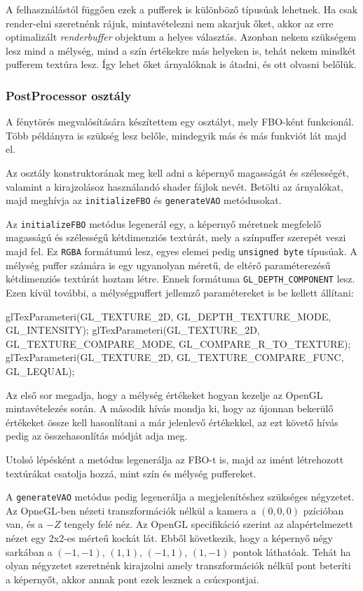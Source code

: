 A felhasználástól függően ezek a pufferek is különböző típusúak lehetnek. Ha csak render-elni szeretnénk rájuk, mintavételezni nem akarjuk őket, akkor az erre optimalizált \textit{renderbuffer} objektum a helyes választás. Azonban nekem szükségem lesz mind a mélység, mind a szín értékekre más helyeken is, tehát nekem mindkét pufferem textúra lesz. Így lehet őket árnyalóknak is átadni, és ott olvasni belőlük. 

\subsubsection{PostProcessor osztály}
A fénytörés megvalósítására készítettem egy osztályt, mely FBO-ként funkcionál. Több példányra is szükség lesz belőle, mindegyik más és más funkviót lát majd el.

Az osztály konstruktorának meg kell adni a képernyő magasságát és szélességét, valamint a kirajzolásoz használandó shader fájlok nevét. Betölti az árnyalókat, majd meghívja az \texttt{initializeFBO} és \texttt{generateVAO} metódusokat.

Az \texttt{initializeFBO} metódus legenerál egy, a képernyő méretnek megfelelő magasságú és szélességű kétdimenziós textúrát, mely a színpuffer szerepét veszi majd fel. Ez \texttt{RGBA} formátumú lesz, egyes elemei pedig \texttt{unsigned byte} típusúak. A mélység puffer számára is egy ugyanolyan méretű, de eltérő paraméterezésű kétdimenziós textúrát hoztam létre. Ennek formátuma \texttt{GL\_DEPTH\_COMPONENT} lesz. Ezen kívül további, a mélységpuffert jellemző paramétereket is be kellett állítani:
\begin{cpp}
glTexParameteri(GL_TEXTURE_2D, GL_DEPTH_TEXTURE_MODE, GL_INTENSITY);
glTexParameteri(GL_TEXTURE_2D, GL_TEXTURE_COMPARE_MODE, 
						GL_COMPARE_R_TO_TEXTURE);
glTexParameteri(GL_TEXTURE_2D, GL_TEXTURE_COMPARE_FUNC, GL_LEQUAL);
\end{cpp}
Az első sor megadja, hogy a mélység értékeket hogyan kezelje az OpenGL mintavételezés során. A második hívás mondja ki, hogy az újonnan bekerülő értékeket össze kell hasonlítani a már jelenlevő értékekkel, az ezt követő hívás pedig az összehasonlítás módját adja meg.

Utolsó lépésként a metódus legenerálja az FBO-t is, majd az imént létrehozott textúrákat csatolja hozzá, mint szín és mélység puffereket.

A \texttt{generateVAO} metódus pedig legenerálja a megjelenítéshez szükséges négyzetet. Az OpneGL-ben nézeti transzformációk nélkül a kamera a $(0, 0, 0)$ pzícióban van, és a $-Z$ tengely felé néz. Az OpenGL specifikáció szerint az alapértelmezett nézet egy 2x2-es mérteű kockát lát. Ebből következik, hogy a képernyő négy sarkában a $(-1, -1)$, $(1, 1)$, $(-1, 1)$, $(1, -1)$ pontok láthatóak. Tehát ha olyan négyzetet szeretnénk kirajzolni amely transzformációk nélkül pont beteríti a képernyőt, akkor annak pont ezek lesznek a csúcspontjai.

